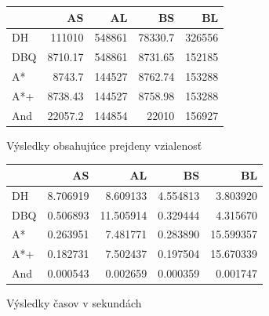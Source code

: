 \begin{figure}[H]
	\centering
	\begin{tabular}{|l | r|r|r|r|}
	\hline
	 & AS & AL & BS & BL \\
	\hline
	DH & 111010 & 548861 & 78330.7& 326556\\
	DBQ & 8710.17 & 548861 & 8731.65 & 152185 \\
	A* & 8743.7 & 144527& 8762.74 & 153288 \\
	A*+ & 8738.43& 144527 & 8758.98 & 153288 \\
	And & 22057.2 & 144854 & 22010 & 156927 \\
	\hline
	\end{tabular}
	\caption{Výsledky obsahujúce prejdeny vzialenosť}
	\label{fig:totalpath_result}
\end{figure}

\begin{figure}[H]
	\centering
	\begin{tabular}{|l | r|r|r|r|}
	\hline
	 & AS & AL & BS & BL \\
	\hline
	DH & 8.706919 & 8.609133 & 4.554813 & 3.803920 \\
	DBQ & 0.506893 & 11.505914 &  0.329444 & 4.315670\\
	A* & 0.263951 & 7.481771 & 0.283890 & 15.599357 \\
	A*+  & 0.182731 & 7.502437 &  0.197504 & 15.670339 \\
	And  &  0.000543 & 0.002659 & 0.000359 & 0.001747\\
	\hline
	\end{tabular}
	\caption{Výsledky časov v sekundách}
	\label{fig:totaltime_result}
\end{figure}
